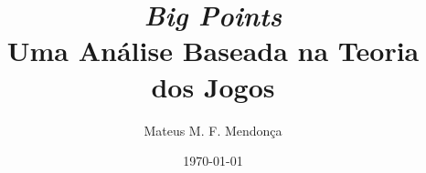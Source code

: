 \title{\textit{Big Points}\\Uma Análise Baseada na Teoria dos Jogos}
\author{Mateus M. F. Mendonça}
\date{\today}

\maketitle
